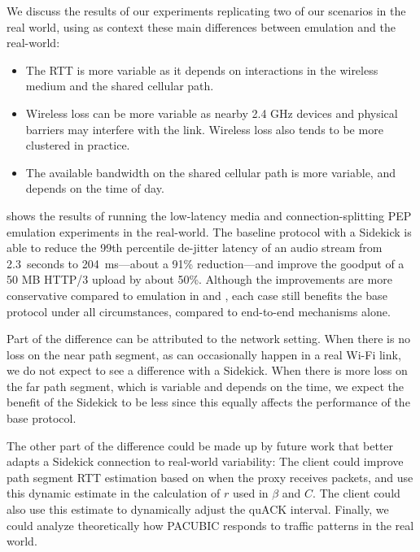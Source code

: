 

We discuss the results of our experiments replicating two of our scenarios in
the real world, using as context
these main differences between emulation and the real-world:

\begin{itemize}[noitemsep,topsep=0pt]
  \item The RTT is more variable as it depends on interactions in the
  wireless medium and the shared cellular path.
  \item Wireless loss can be more variable as nearby 2.4 GHz devices and
  physical barriers may interfere with the link. Wireless loss also tends
  to be more clustered in practice.
  \item The available bandwidth on the shared cellular path is more variable,
  and depends on the time of day.
\end{itemize}

 shows the results of running the low-latency media and
connection-splitting PEP emulation experiments in the real-world. The baseline
protocol with a Sidekick is able to
reduce the 99th percentile de-jitter latency of an audio stream
from 2.3~seconds to 204~ms---about a 91\% reduction---and
improve the goodput of a 50 MB HTTP/3 upload by about 50\%.
Although the improvements are more conservative compared to emulation in
 and , each case still benefits the
base protocol under all circumstances, compared to end-to-end mechanisms alone.

Part of the difference can be attributed to the network setting. When there is
no loss on the near path segment, as can occasionally happen in a real Wi-Fi link,
we do not expect to
see a difference with a Sidekick. When there is more loss on the far path segment, which
is variable and depends on the time, we
expect the benefit of the Sidekick to be less since this equally affects the
performance of the base protocol.

The other part of the difference could be made up by future work that better
adapts a Sidekick connection to real-world variability: The client could improve
path segment RTT estimation based on when the proxy receives packets, and use this
dynamic estimate in the calculation of $r$ used in $\beta$ and $C$.
The client could also use
this estimate to dynamically adjust the quACK interval.
Finally, we could analyze theoretically how PACUBIC responds
to traffic patterns in the real world.

